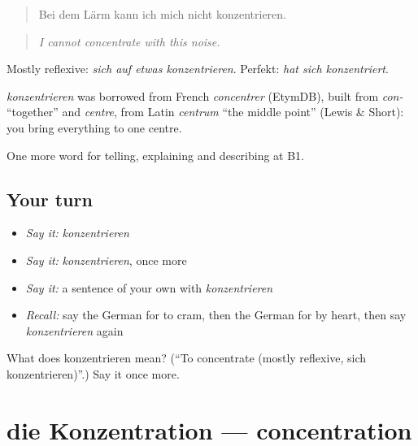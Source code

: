 \begin{quote}
Bei dem Lärm kann ich mich nicht konzentrieren.
\end{quote}

\begin{quote}
\emph{I cannot concentrate with this noise.}
\end{quote}

Mostly reflexive: \emph{sich auf etwas konzentrieren}. Perfekt: \emph{hat sich konzentriert}.

\begin{cousinweb}
\emph{konzentrieren} was borrowed from French \emph{concentrer} (EtymDB), built from \emph{con-} \textquotedblleft{}together\textquotedblright{} and \emph{centre}, from Latin \emph{centrum} \textquotedblleft{}the middle point\textquotedblright{} (Lewis \& Short): you bring everything to one centre.
\end{cousinweb}

\begin{grammarlens}[title={What you've built}]
One more word for telling, explaining and describing at B1.
\end{grammarlens}

\subsection*{Your turn}
\begin{itemize}
\raggedright
  \item \emph{Say it:} \emph{konzentrieren}
  \item \emph{Say it:} \emph{konzentrieren}, once more
  \item \emph{Say it:} a sentence of your own with \emph{konzentrieren}
  \item \emph{Recall:} say the German for to cram, then the German for by heart, then say \emph{konzentrieren} again
\end{itemize}

\begin{tcolorbox}[breakable,colback=teal!4,colframe=teal!35!black,title={Before you move on}]
What does konzentrieren mean? (\textquotedblleft{}To concentrate (mostly reflexive, sich konzentrieren)\textquotedblright{}.) Say it once more.
\end{tcolorbox}
\section[die Konzentration]{die Konzentration — concentration}

